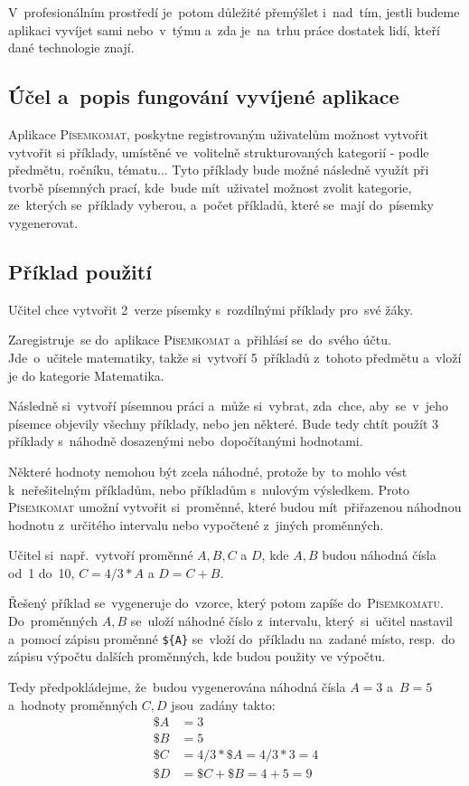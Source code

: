 \documentclass[14pt,a4paper]{article}
\begin{document}
        V~profesionálním prostředí je~potom důležité přemýšlet i~nad~tím, jestli budeme aplikaci vyvíjet sami nebo~v~týmu a~zda je~na~trhu práce dostatek lidí, kteří dané technologie znají.

        \subsection{Účel a~popis fungování vyvíjené aplikace}
        Aplikace \textsc{Písemkomat}, poskytne registrovaným uživatelům možnost vytvořit vytvořit si příklady, umístěné ve~volitelně
        strukturovaných kategorií - podle předmětu, ročníku, tématu... Tyto příklady bude možné následně využít při tvorbě písemných prací,
        kde~bude mít~uživatel možnost zvolit kategorie, ze~kterých se~příklady vyberou, a~počet příkladů, které se~mají do~písemky vygenerovat. 
        \subsection{Příklad použití}
        Učitel chce vytvořit 2~verze písemky s~rozdílnými příklady pro~své žáky.
        
        Zaregistruje~se do~aplikace \textsc{Písemkomat} a~přihlásí se~do~svého účtu. Jde~o~učitele matematiky, takže si~vytvoří 5~příkladů z~tohoto předmětu a~vloží je do kategorie Matematika.

        Následně si~vytvoří písemnou práci a~může si~vybrat, zda~chce, aby~se~v~jeho písemce objevily všechny příklady, nebo jen některé. Bude tedy chtít použít 3\,příklady s~náhodně dosazenými nebo~dopočítanými hodnotami.
        
        Některé hodnoty nemohou být zcela náhodné, protože by~to mohlo vést k~neřešitelným příkladům, nebo příkladům s~nulovým výsledkem.
        Proto \textsc{Písemkomat} umožní vytvořit si~proměnné, které budou mít~přiřazenou náhodnou hodnotu z~určitého intervalu nebo vypočtené z~jiných proměnných.

        Učitel si~např.~vytvoří proměnné $A, B, C$ a $D$, kde $A, B$ budou náhodná čísla od~1 do~10, $C = 4/3*A$ a $D = C + B$.

        Řešený příklad se~vygeneruje do~vzorce, který potom zapíše do~\textsc{Písemkomatu}. Do~proměnných $A, B$ se~uloží náhodné číslo z~intervalu, který~si~učitel nastavil a~pomocí zápisu proměnné \texttt{\$\{A\}} se~vloží do~příkladu na~zadané místo, resp.~do zápisu výpočtu dalších proměnných, kde budou použity ve výpočtu.
        
        Tedy předpokládejme, že~budou vygenerována náhodná čísla $A = 3$ a~$B = 5$
        a~hodnoty proměnných $C, D$ jsou~zadány takto:
        \begin{align*}
            \$A &= 3 \\
            \$B &= 5 \\
            \$C &= 4/3*\$A = 4/3*3 = 4 \\
            \$D &= \$C + \$B = 4 + 5 = 9
        \end{align*}
\end{document}
